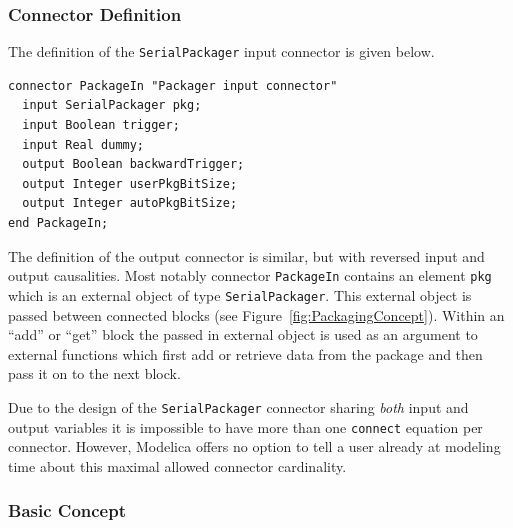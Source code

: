 \documentclass{resources/modelica}
\newcommand{\modelica}[1]{\lstinline[language=modelica]|#1|}
\begin{document}
\subsubsection{Connector Definition}

The definition of the \modelica{SerialPackager} input connector is given below.
\begin{lstlisting}[language=modelica]
connector PackageIn "Packager input connector"
  input SerialPackager pkg;
  input Boolean trigger;
  input Real dummy;
  output Boolean backwardTrigger;
  output Integer userPkgBitSize;
  output Integer autoPkgBitSize;
end PackageIn;
\end{lstlisting}
The definition of the output connector is similar, but with reversed input and
output causalities. Most notably connector \modelica{PackageIn} contains an
element \modelica{pkg} which is an external object of type \modelica{SerialPackager}.
This external object is passed between connected blocks (see
Figure~\ref{fig:PackagingConcept}). Within an ``add'' or ``get'' block the
passed in external object is used as an argument to external functions which
first add or retrieve data from the package and then pass it on to the next block.

Due to the design of the \modelica{SerialPackager} connector sharing \emph{both} input and output variables it is impossible to have more than one \modelica{connect} equation per connector.
However, Modelica offers no option to tell a user already at modeling time about this maximal allowed connector cardinality.

\subsubsection{Basic Concept}
\end{document}
